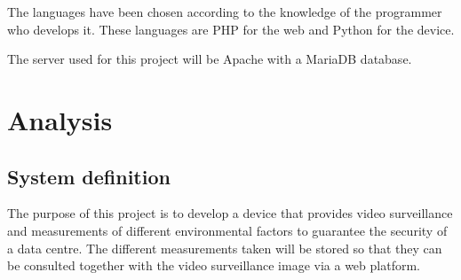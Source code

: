 The languages have been chosen according to the knowledge of the programmer who develops it. These languages are PHP for the web and Python for the device.

The server used for this project will be Apache with a MariaDB database.

\section{Analysis}\label{sec:analysis}
\subsection{System definition}\label{subsec:system-definition}
The purpose of this project is to develop a device that provides video surveillance and measurements of different environmental factors to guarantee the security of a data centre. The different measurements taken will be stored so that they can be consulted together with the video surveillance image via a web platform.
